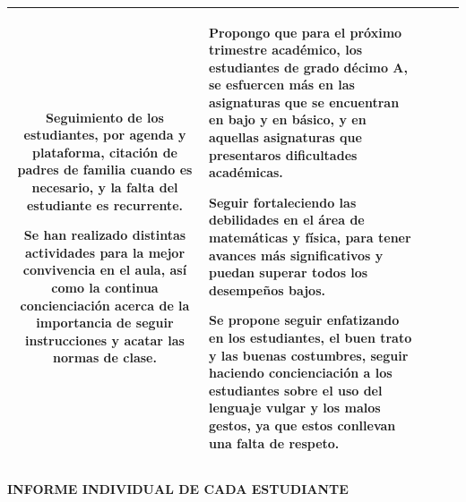 \documentclass[spanish,11pt,a4paper]{article}
\begin{document}
{\begin{tabular}{|c|p{4cm}|p{4cm}|p{4cm}|p{4cm}|}
			Seguimiento de los estudiantes, por agenda y plataforma, citación de padres de familia cuando es necesario, y la falta del estudiante es recurrente.
			
			Se han realizado distintas actividades para la mejor convivencia en el aula, así como la continua concienciación acerca de la importancia de seguir instrucciones y acatar las normas de clase. &
			
			Propongo  que para el próximo trimestre académico, los estudiantes de grado décimo A, se esfuercen más en las asignaturas que se encuentran en bajo y en básico, y en aquellas asignaturas que presentaros dificultades académicas.
			
			Seguir fortaleciendo las debilidades en el área de matemáticas y física, para tener avances más significativos y puedan superar todos los desempeños bajos.
			
			Se propone seguir enfatizando en los estudiantes, el buen trato y las buenas costumbres, seguir haciendo concienciación a los estudiantes sobre el uso del lenguaje vulgar y los malos gestos, ya que estos conllevan una falta de respeto.
			\\
			\hline
	\end{tabular}}
	\newpage
	
	\textbf{INFORME INDIVIDUAL DE CADA ESTUDIANTE}
	
\end{document}
